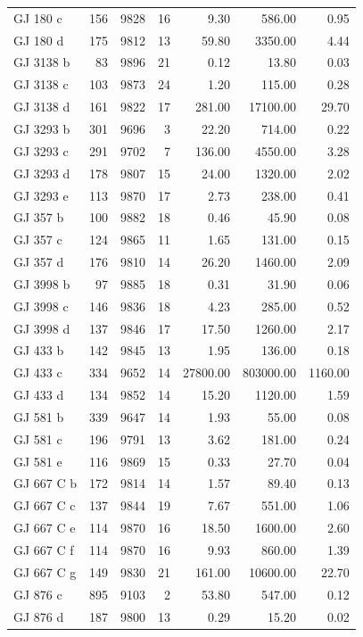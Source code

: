 \begin{table}
\begin{tabular}{lrrrrrr}
GJ 180 c & 156 & 9828 & 16 & 9.30 & 586.00 & 0.95 \\
GJ 180 d & 175 & 9812 & 13 & 59.80 & 3350.00 & 4.44 \\
GJ 3138 b & 83 & 9896 & 21 & 0.12 & 13.80 & 0.03 \\
GJ 3138 c & 103 & 9873 & 24 & 1.20 & 115.00 & 0.28 \\
GJ 3138 d & 161 & 9822 & 17 & 281.00 & 17100.00 & 29.70 \\
GJ 3293 b & 301 & 9696 & 3 & 22.20 & 714.00 & 0.22 \\
GJ 3293 c & 291 & 9702 & 7 & 136.00 & 4550.00 & 3.28 \\
GJ 3293 d & 178 & 9807 & 15 & 24.00 & 1320.00 & 2.02 \\
GJ 3293 e & 113 & 9870 & 17 & 2.73 & 238.00 & 0.41 \\
GJ 357 b & 100 & 9882 & 18 & 0.46 & 45.90 & 0.08 \\
GJ 357 c & 124 & 9865 & 11 & 1.65 & 131.00 & 0.15 \\
GJ 357 d & 176 & 9810 & 14 & 26.20 & 1460.00 & 2.09 \\
GJ 3998 b & 97 & 9885 & 18 & 0.31 & 31.90 & 0.06 \\
GJ 3998 c & 146 & 9836 & 18 & 4.23 & 285.00 & 0.52 \\
GJ 3998 d & 137 & 9846 & 17 & 17.50 & 1260.00 & 2.17 \\
GJ 433 b & 142 & 9845 & 13 & 1.95 & 136.00 & 0.18 \\
GJ 433 c & 334 & 9652 & 14 & 27800.00 & 803000.00 & 1160.00 \\
GJ 433 d & 134 & 9852 & 14 & 15.20 & 1120.00 & 1.59 \\
GJ 581 b & 339 & 9647 & 14 & 1.93 & 55.00 & 0.08 \\
GJ 581 c & 196 & 9791 & 13 & 3.62 & 181.00 & 0.24 \\
GJ 581 e & 116 & 9869 & 15 & 0.33 & 27.70 & 0.04 \\
GJ 667 C b & 172 & 9814 & 14 & 1.57 & 89.40 & 0.13 \\
GJ 667 C c & 137 & 9844 & 19 & 7.67 & 551.00 & 1.06 \\
GJ 667 C e & 114 & 9870 & 16 & 18.50 & 1600.00 & 2.60 \\
GJ 667 C f & 114 & 9870 & 16 & 9.93 & 860.00 & 1.39 \\
GJ 667 C g & 149 & 9830 & 21 & 161.00 & 10600.00 & 22.70 \\
GJ 876 c & 895 & 9103 & 2 & 53.80 & 547.00 & 0.12 \\
GJ 876 d & 187 & 9800 & 13 & 0.29 & 15.20 & 0.02 \\

\end{tabular}
\end{table}
